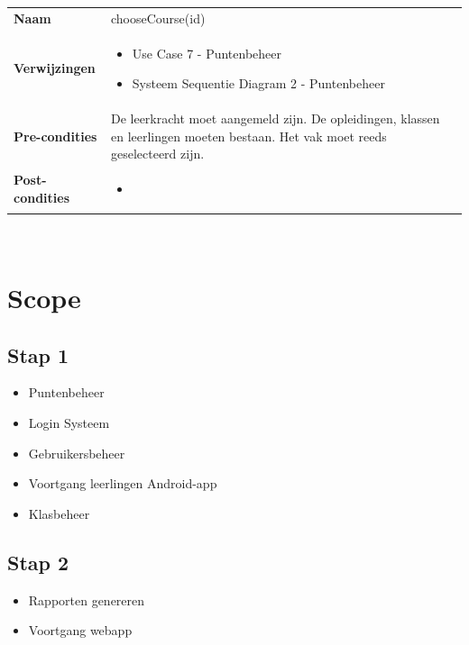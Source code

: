 \documentclass[a4paper]{article}
\begin{document}
\begin{tabularx}{\textwidth}{|l X|}
    \hline
    \textbf{Naam} & chooseCourse(id) \\
    \textbf{Verwijzingen} & \begin{itemize}[leftmargin=*]
        \item Use Case 7 - Puntenbeheer
        \item Systeem Sequentie Diagram 2 - Puntenbeheer
    \end{itemize}\\
    \textbf{Pre-condities} & De leerkracht moet aangemeld zijn. De opleidingen, klassen en leerlingen moeten bestaan. Het vak moet reeds geselecteerd zijn.\\
    \textbf{Post-condities} & \begin{itemize}[leftmargin=*]
        \item 
    \end{itemize}\\
    \hline
\end{tabularx}\\

\newpage
\section{Scope}
\subsection{Stap 1} %
\begin{itemize} 
    \item Puntenbeheer
    \item Login Systeem
    \item Gebruikersbeheer
    \item Voortgang leerlingen Android-app
    \item Klasbeheer
\end{itemize}
\subsection{Stap 2}
\begin{itemize}
    \item Rapporten genereren
    \item Voortgang webapp 
\end{itemize}
\end{document}
